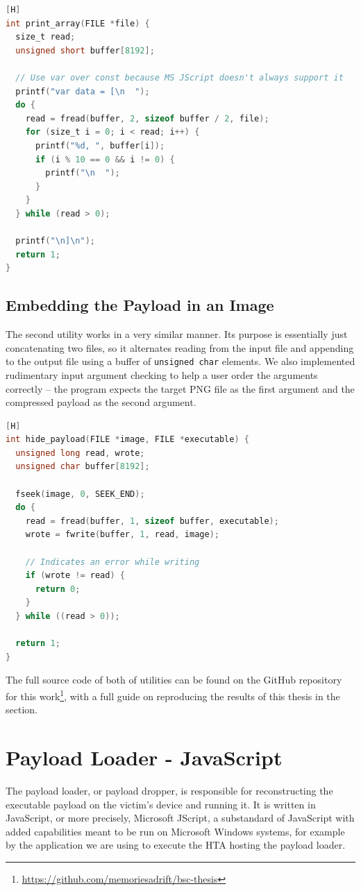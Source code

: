 \begin{lstlisting}[language=C, caption={Payload serialisation function}][H]
int print_array(FILE *file) {
  size_t read;
  unsigned short buffer[8192];

  // Use var over const because MS JScript doesn't always support it
  printf("var data = [\n  ");
  do {
    read = fread(buffer, 2, sizeof buffer / 2, file);
    for (size_t i = 0; i < read; i++) {
      printf("%d, ", buffer[i]);
      if (i % 10 == 0 && i != 0) {
        printf("\n  ");
      }
    }
  } while (read > 0);

  printf("\n]\n");
  return 1;
}
\end{lstlisting}

\subsection{Embedding the Payload in an Image}
The second utility works in a very similar manner. Its purpose is essentially just concatenating two files, so it
alternates reading from the input file and appending to the output file using a buffer of \verb+unsigned char+ elements. 
We also implemented rudimentary input argument checking to help a user order the arguments correctly -- the program 
expects the target \acrshort{PNG} file as the first argument and the compressed payload as the second argument.

\begin{lstlisting}[language=C, caption={Payload concealment function to attach the compressed \acrshort{HTA} to the
\acrshort{PNG}.}][H]
int hide_payload(FILE *image, FILE *executable) {
  unsigned long read, wrote;
  unsigned char buffer[8192];

  fseek(image, 0, SEEK_END);
  do {
    read = fread(buffer, 1, sizeof buffer, executable);
    wrote = fwrite(buffer, 1, read, image);

    // Indicates an error while writing
    if (wrote != read) {
      return 0;
    }
  } while ((read > 0));

  return 1;
}
\end{lstlisting}

The full source code of both of utilities can be found on the GitHub repository for this 
work\footnote{\url{https://github.com/memoriesadrift/bsc-thesis}}, with a full guide on reproducing the results of this 
thesis in the  section.

\section{Payload Loader - JavaScript} \label{sec:impl-loader}
The payload loader, or payload dropper, is responsible for reconstructing the executable payload on the victim's device
and running it. It is written in JavaScript, or more precisely, Microsoft JScript, a substandard of JavaScript with
added capabilities meant to be run on Microsoft Windows systems, for example by the application we are using to execute
the \acrfull{HTA} hosting the payload loader.


